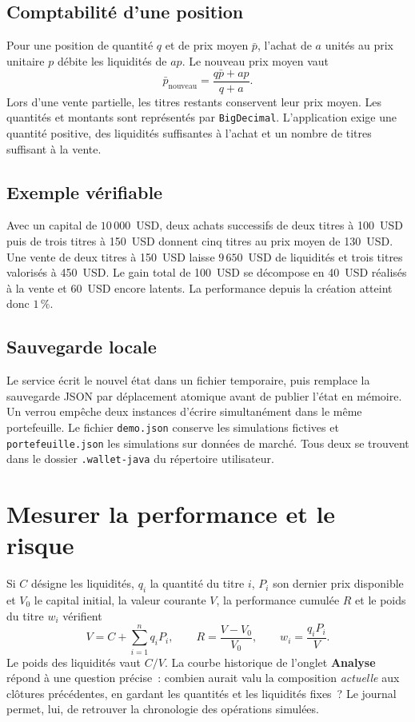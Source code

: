 \documentclass[11pt,a4paper]{article}
\newcommand{\code}[1]{\texttt{#1}}
\newcommand{\rubrique}[1]{\section*{\textcolor{foret}{#1}}}
\begin{document}
\subsection*{Comptabilité d'une position}
Pour une position de quantité $q$ et de prix moyen $\bar p$, l'achat de $a$ unités au prix unitaire $p$ débite les liquidités de $ap$. Le nouveau prix moyen vaut
\[
    \bar p_{\mathrm{nouveau}}=\frac{q\bar p+ap}{q+a}.
\]
Lors d'une vente partielle, les titres restants conservent leur prix moyen. Les quantités et montants sont représentés par \code{BigDecimal}. L'application exige une quantité positive, des liquidités suffisantes à l'achat et un nombre de titres suffisant à la vente.

\subsection*{Exemple vérifiable}
Avec un capital de $10\,000$~USD, deux achats successifs de deux titres à 100~USD puis de trois titres à 150~USD donnent cinq titres au prix moyen de 130~USD. Une vente de deux titres à 150~USD laisse $9\,650$~USD de liquidités et trois titres valorisés à 450~USD. Le gain total de 100~USD se décompose en 40~USD réalisés à la vente et 60~USD encore latents. La performance depuis la création atteint donc $1\,\%$.

\subsection*{Sauvegarde locale}
Le service écrit le nouvel état dans un fichier temporaire, puis remplace la sauvegarde JSON par déplacement atomique avant de publier l'état en mémoire. Un verrou empêche deux instances d'écrire simultanément dans le même portefeuille. Le fichier \code{demo.json} conserve les simulations fictives et \code{portefeuille.json} les simulations sur données de marché. Tous deux se trouvent dans le dossier \code{.wallet-java} du répertoire utilisateur.

\newpage
\rubrique{Mesurer la performance et le risque}

Si $C$ désigne les liquidités, $q_i$ la quantité du titre $i$, $P_i$ son dernier prix disponible et $V_0$ le capital initial, la valeur courante $V$, la performance cumulée $R$ et le poids du titre $w_i$ vérifient
\[
   V=C+\sum_{i=1}^{n}q_iP_i,\qquad
   R=\frac{V-V_0}{V_0},\qquad
   w_i=\frac{q_iP_i}{V}.
\]
Le poids des liquidités vaut $C/V$. La courbe historique de l'onglet \textbf{Analyse} répond à une question précise~: combien aurait valu la composition \emph{actuelle} aux clôtures précédentes, en gardant les quantités et les liquidités fixes~? Le journal permet, lui, de retrouver la chronologie des opérations simulées.
\end{document}
